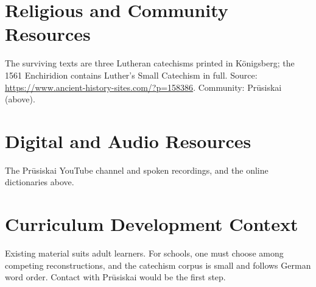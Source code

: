 \documentclass[12pt]{article}
\begin{document}
\section{Religious and Community Resources}
The surviving texts are three Lutheran catechisms printed in K\"onigsberg; the 1561 Enchiridion contains Luther's Small Catechism in full. Source: \url{https://www.ancient-history-sites.com/?p=158386}. Community: Pr\={u}siskai (above).

\section{Digital and Audio Resources}
The Pr\={u}siskai YouTube channel and spoken recordings, and the online dictionaries above.

\section{Curriculum Development Context}
Existing material suits adult learners. For schools, one must choose among competing reconstructions, and the catechism corpus is small and follows German word order. Contact with Pr\={u}siskai would be the first step.
\end{document}
